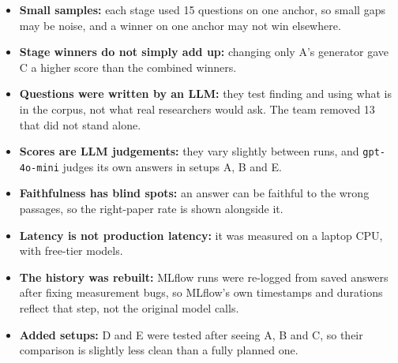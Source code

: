 \documentclass[10pt,a4paper,landscape]{article}
\begin{document}
\begin{itemize}\setlength{\itemsep}{1pt}
\item \textbf{Small samples:} each stage used 15 questions on one anchor, so small gaps may be noise, and a winner on one anchor may not win elsewhere.
\item \textbf{Stage winners do not simply add up:} changing only A's generator gave C a higher score than the combined winners.
\item \textbf{Questions were written by an LLM:} they test finding and using what is in the corpus, not what real researchers would ask. The team removed 13 that did not stand alone.
\item \textbf{Scores are LLM judgements:} they vary slightly between runs, and \texttt{gpt-4o-mini} judges its own answers in setups A, B and E.
\item \textbf{Faithfulness has blind spots:} an answer can be faithful to the wrong passages, so the right-paper rate is shown alongside it.
\item \textbf{Latency is not production latency:} it was measured on a laptop CPU, with free-tier models.
\item \textbf{The history was rebuilt:} MLflow runs were re-logged from saved answers after fixing measurement bugs, so MLflow's own timestamps and durations reflect that step, not the original model calls.
\item \textbf{Added setups:} D and E were tested after seeing A, B and C, so their comparison is slightly less clean than a fully planned one.
\end{itemize}
\end{document}
